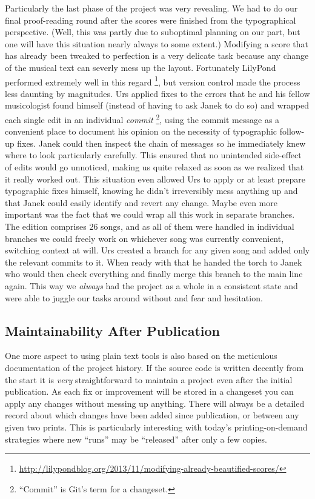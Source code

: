 \documentclass[11pt,a4paper]{article}
\begin{document}
Particularly the last phase of the project was very revealing. We had to do our final
proof-reading round after the scores were finished from the typographical perspective.
(Well, this was partly due to suboptimal planning on our part, but one will have this
situation nearly always to some extent.) Modifying a score that has already been tweaked
to perfection is a very delicate task because any change of the musical text can
severly mess up the layout. Fortunately LilyPond performed extremely well in this regard%
\footnote{\url{http://lilypondblog.org/2013/11/modifying-already-beautified-scores/}},
but version control made the process less daunting by magnitudes.
Urs applied fixes to the errors that he and his fellow musicologist found himself (instead
of having to ask Janek to do so) and wrapped each single edit in an individual \emph{commit}%
\footnote{“Commit” is Git's term for a changeset.},
using the commit message as a convenient place to document his opinion on the necessity of
typographic follow-up fixes. Janek could then inspect the chain of messages so he
immediately knew where to look particularly carefully. This ensured that no unintended
side-effect of edits would go unnoticed, making us quite relaxed as soon as we realized
that it really worked out. This situation even allowed Urs to apply or at least prepare
typographic fixes himself, knowing he didn't irreversibly mess anything up and that Janek
could easily identify and revert any change.
Maybe even more important was the fact that we could wrap all this work in separate branches.
The edition comprises 26 songs, and as all of them were handled in individual branches
we could freely work on whichever song was currently convenient, switching context at
will. Urs created a branch for any given song and added only the relevant commits to it.
When ready with that he handed the torch to Janek who would then check everything and
finally merge this branch to the main line again. This way we \emph{always} had the project
as a whole in a consistent state and were able to juggle our tasks around without and fear
and hesitation.

\subsection{Maintainability After Publication}
One more aspect to using plain text tools is also based on the meticulous documentation
of the project history. If the source code is written decently from the start it is
\emph{very} straightforward to maintain a project even after the initial publication.
As each fix or improvement will be stored in a changeset you can apply any changes
without messing up anything. There will always be a detailed record about which
changes have been added since publication, or between any given two prints. This is
particularly interesting with today's printing-on-demand strategies where new “runs”
may be “released” after only a few copies.
\end{document}
